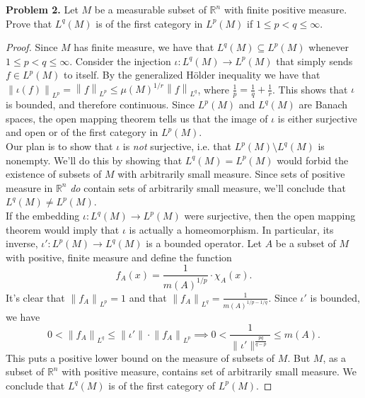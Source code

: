 \documentclass[11pt,letterpaper]{report}
\newcommand{\reals}{\mathbb{R}}
\newcommand{\Lp}[2]{\left\|{#1}\right\|_{L^{#2}}}
\begin{document}
\noindent\textbf{Problem 2. }
Let $M$ be a measurable subset of $\reals^n$ with finite positive measure. Prove that $L^q(M)$ is of the first category in $L^p(M)$ if $1\leq p<q\leq \infty$.
\begin{proof}
	Since $M$ has finite measure, we have that $L^q(M)\subseteq L^p(M)$ whenever $1\leq p<q\leq \infty$. Consider the injection $\iota: L^q(M)\to L^p(M)$ that simply sends $f\in L^p(M)$ to itself. By the generalized H\"older inequality we have that $\Lp{\iota(f)}{p} = \Lp{f}{p}\leq \mu(M)^{1/r}\Lp{f}{q}$, where $\frac{1}{p} = \frac{1}{q} + \frac{1}{r}$. This shows that $\iota$ is bounded, and therefore continuous. Since $L^p(M)$ and $L^q(M)$ are Banach spaces, the open mapping theorem tells us that the image of $\iota$ is either surjective and open or of the first category in $L^p(M)$.\\

	\noindent Our plan is to show that $\iota$ is \textit{not} surjective, i.e. that $L^p(M)\setminus L^q(M)$ is nonempty. We'll do this by showing that $L^q(M) = L^p(M)$ would forbid the existence of subsets of $M$ with arbitrarily small measure. Since sets of positive measure in $\mathbb{R}^n$ \textit{do} contain sets of arbitrarily small measure, we'll conclude that $L^q(M)\neq L^p(M)$.\\

	\noindent If the embedding $\iota: L^q(M)\to L^p(M)$ were surjective, then the open mapping theorem would imply that $\iota$ is actually a homeomorphism. In particular, its inverse, $\iota': L^p(M)\to L^q(M)$ is a bounded operator. Let $A$ be a subset of $M$ with positive, finite measure and define the function
	\[
	f_A(x) = \frac{1}{m(A)^{1/p}}\cdot \chi_A(x).
	\]
	It's clear that $\Lp{f_A}{p} = 1$ and that $\Lp{f_A}{q} = \frac{1}{m(A)^{1/p-1/q}}$. Since $\iota'$ is bounded, we have
	\[
	0<\Lp{f_A}{q} \leq \|\iota'\|\cdot \Lp{f_A}{p} \implies 0<\frac{1}{\|\iota'\|^{\frac{pq}{q-p}}}\leq m(A).
	\]
	This puts a positive lower bound on the measure of subsets of $M$. But $M$, as a subset of $\reals^n$ with positive measure, contains set of arbitrarily small measure. We conclude that $L^q(M)$ is of the first category of $L^p(M)$.
\end{proof}
\end{document}
